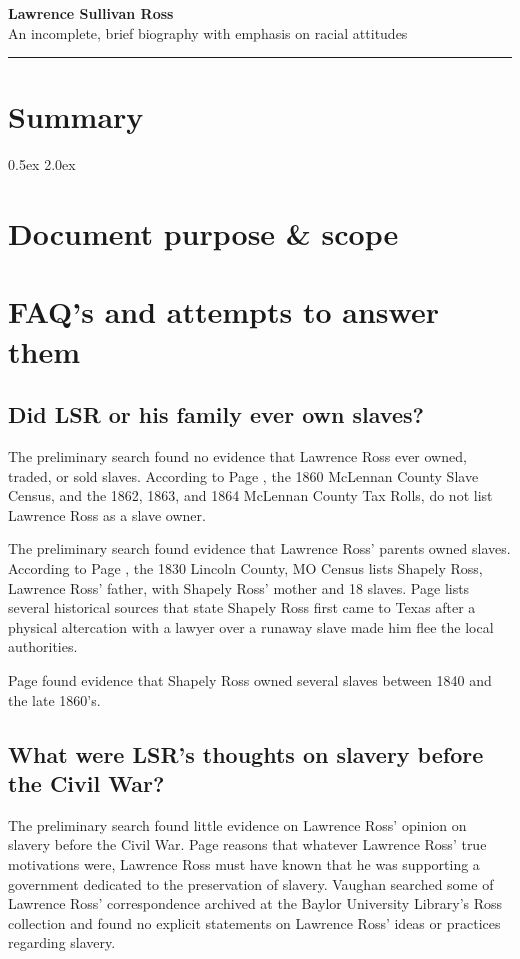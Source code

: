 \documentclass[12pt]{article}
\begin{document}
\Large{\textbf{Lawrence Sullivan Ross \\}}
\large{An incomplete, brief biography with emphasis on racial attitudes \\}
\rule{\textwidth}{1pt}

\section{Summary}

\parskip 0.5ex
\newpage
\tableofcontents
\parskip 2.0ex

\newpage
\section{Document purpose \& scope}

\newpage
\section{FAQ's and attempts to answer them}

\subsection{Did LSR or his family ever own slaves? }
The preliminary search found no evidence that Lawrence Ross ever owned, traded, or sold slaves. According to Page \cite[pg.49]{page}, the 1860 McLennan County Slave Census, and the 1862, 1863, and 1864 McLennan County Tax Rolls, do not list Lawrence Ross as a slave owner.

The preliminary search found evidence that Lawrence Ross' parents owned slaves. According to Page \cite[pg.49]{page}, the 1830 Lincoln County, MO Census lists Shapely Ross, Lawrence Ross' father, with Shapely Ross' mother and 18 slaves. Page \cite[pg.50--51]{page} lists several historical sources that state Shapely Ross first came to Texas after a physical altercation with a lawyer over a runaway slave made him flee the local authorities. 

Page \cite[pg.51--55]{page} found evidence that Shapely Ross owned several slaves between 1840 and the late 1860's. 

\subsection{What were LSR's thoughts on slavery before the Civil War? }
The preliminary search found little evidence on Lawrence Ross' opinion on slavery before the Civil War. Page \cite[pg. 59]{page} reasons that whatever Lawrence Ross' true motivations were, Lawrence Ross must have known that he was supporting a government dedicated to the preservation of slavery. Vaughan \cite{vaughan:email} searched some of Lawrence Ross' correspondence archived at the Baylor University Library's Ross collection and found no explicit statements on Lawrence Ross' ideas or practices regarding slavery. 
\end{document}
